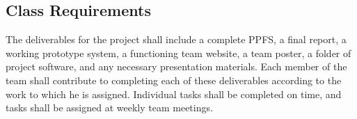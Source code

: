 \documentclass[PPFS.tex]{template/subfiles}
\begin{document}
\subsection{Class Requirements}
The deliverables for the project shall include a complete PPFS, a final report, a working prototype system, a functioning team website, a team poster, a folder of project software, and any necessary presentation materials. Each member of the team shall contribute to completing each of these deliverables according to the work to which he is assigned. Individual tasks shall be completed on time, and tasks shall be assigned at weekly team meetings.
\end{document}

